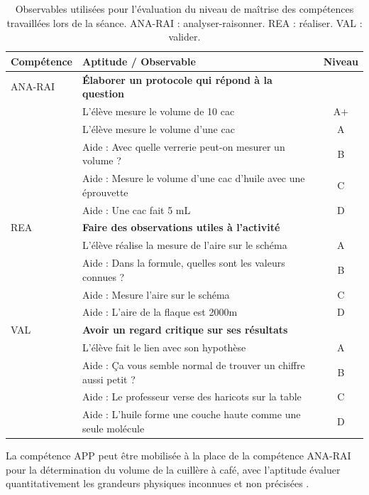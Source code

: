 \documentclass[12pt,a4paper, fleqn]{article}
\newcommand{\app}{\colorbox{bleu_c}{\textcolor{bleu_f}{APP}}}
\newcommand{\rea}{\colorbox{yellow_c}{\textcolor{yellow_f}{REA}}}
\newcommand{\anarai}{\colorbox{green_c}{\textcolor{green_f}{ANA-RAI}}}
\newcommand{\val}{\colorbox{orange_c}{\textcolor{orange_f}{VAL}}}
\begin{document}
\begin{table}[h]
\center
\begin{tabular}{l|l|c}
\textbf{Compétence} & \textbf{Aptitude} / Observable & \textbf{Niveau} \\
\hline \hline
\anarai 	& \textbf{Élaborer un protocole qui répond à la question} 	& \\
				& L'élève mesure le volume de 10 cac				 						& A+ \\
				& L'élève mesure le volume d'une cac 									& A \\
				& Aide : Avec quelle verrerie peut-on mesurer un volume ?	& B \\
				& Aide : Mesure le volume d'une cac d'huile avec une éprouvette & C \\
				& Aide : Une cac fait 5 mL 															& D \\
\hline
\rea			& \textbf{Faire des observations utiles à l'activité}					& \\
				& L'élève réalise la mesure de l'aire sur le schéma				& A \\
				& Aide : Dans la formule, quelles sont les valeurs connues ? & B \\
				& Aide : Mesure l'aire sur le schéma											& C \\
				& Aide : L'aire de la flaque est \unit{2000}{m\squared}			& D \\
\hline
\val			& \textbf{Avoir un regard critique sur ses résultats}				& \\
				& L'élève fait le lien avec son hypothèse									& A \\
				& Aide : Ça vous semble normal de trouver un chiffre aussi petit ? & B \\
				& Aide : Le professeur verse des haricots sur la table			& C \\
				& Aide : L'huile forme une couche haute comme une seule molécule & D \\
\end{tabular}
\caption{Observables utilisées pour l'évaluation du niveau de maîtrise des compétences travaillées lors de la séance.
\anarai{} : analyser-raisonner.
\rea{} : réaliser.
\val{} : valider.}
\label{tab:cptces_tp}
\end{table}

La compétence \app{} peut être mobilisée à la place de la compétence \anarai{} pour la détermination du volume de la cuillère à café, avec l'aptitude \og évaluer quantitativement les grandeurs physiques inconnues et non précisées \fg{}.
\end{document}
